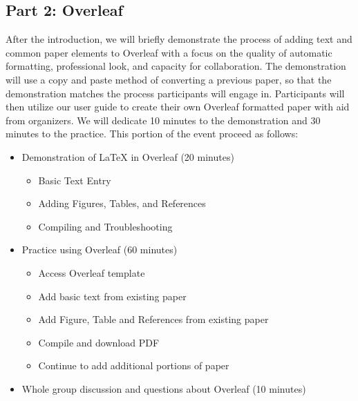 \documentclass{article}
\begin{document}
\subsection{Part 2: Overleaf}
After the introduction, we will briefly demonstrate the process of adding text and common paper elements to Overleaf with a focus on the quality of automatic formatting, professional look, and capacity for collaboration. The demonstration will use a copy and paste method of converting a previous paper, so that the demonstration matches the process participants will engage in. Participants will then utilize our user guide to create their own Overleaf formatted paper with aid from organizers. We will dedicate 10 minutes to the demonstration and 30 minutes to the practice. This portion of the event proceed as follows: 
\begin{itemize}
    \item Demonstration of LaTeX in Overleaf (20 minutes)
    \begin{itemize}
        \item Basic Text Entry
        \item Adding Figures, Tables, and References
        \item Compiling and Troubleshooting
    \end{itemize}
    \item Practice using Overleaf (60 minutes)
    \begin{itemize}
        \item Access Overleaf template
        \item Add basic text from existing paper
        \item Add Figure, Table and References from existing paper
        \item Compile and download PDF
        \item Continue to add additional portions of paper
    \end{itemize}
    \item Whole group discussion and questions about Overleaf (10 minutes)
\end{itemize}

\end{document}
